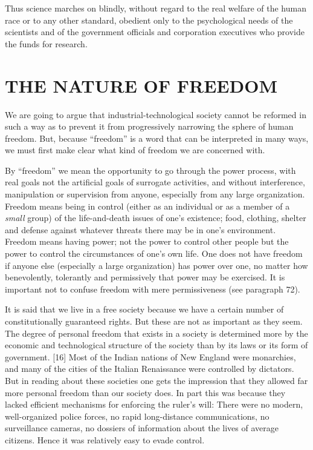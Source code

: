  Thus science marches on blindly, without regard to the real welfare of the human race or to any other standard, obedient only to the psychological needs of the scientists and of the government officials and corporation executives who provide the funds for research.

\chapter{THE NATURE OF FREEDOM}

 We are going to argue that industrial-technological society cannot be reformed in such a way as to prevent it from progressively narrowing the sphere of human freedom. But, because “freedom” is a word that can be interpreted in many ways, we must first make clear what kind of freedom we are concerned with.

 By “freedom” we mean the opportunity to go through the power process, with real goals not the artificial goals of surrogate activities, and without interference, manipulation or supervision from anyone, especially from any large organization. Freedom means being in control (either as an individual or as a member of a {\em small} group) of the life-and-death issues of one’s existence; food, clothing, shelter and defense against whatever threats there may be in one’s environment. Freedom means having power; not the power to control other people but the power to control the circumstances of one’s own life. One does not have freedom if anyone else (especially a large organization) has power over one, no matter how benevolently, tolerantly and permissively that power may be exercised. It is important not to confuse freedom with mere permissiveness (see paragraph 72).

 It is said that we live in a free society because we have a certain number of constitutionally guaranteed rights. But these are not as important as they seem. The degree of personal freedom that exists in a society is determined more by the economic and technological structure of the society than by its laws or its form of government. [16] Most of the Indian nations of New England were monarchies, and many of the cities of the Italian Renaissance were controlled by dictators. But in reading about these societies one gets the impression that they allowed far more personal freedom than our society does. In part this was because they lacked efficient mechanisms for enforcing the ruler’s will: There were no modern, well-organized police forces, no rapid long-distance communications, no surveillance cameras, no dossiers of information about the lives of average citizens. Hence it was relatively easy to evade control.


